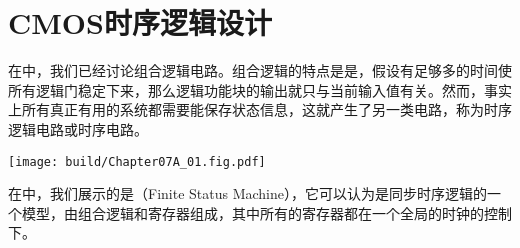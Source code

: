 \chapter{CMOS时序逻辑设计}
在中，我们已经讨论组合逻辑电路。组合逻辑的特点是是，假设有足够多的时间使所有逻辑门稳定下来，那么逻辑功能块的输出就只与当前输入值有关。然而，事实上所有真正有用的系统都需要能保存状态信息，这就产生了另一类电路，称为时序逻辑电路或时序电路。

\begin{Figure}[有限状态机]
    \texttt{[image: build/Chapter07A\_01.fig.pdf]}
\end{Figure}

在中，我们展示的是（Finite Status Machine），它可以认为是同步时序逻辑的一个模型，由组合逻辑和寄存器组成，其中所有的寄存器都在一个全局的时钟的控制下。





